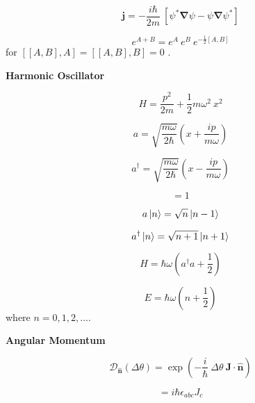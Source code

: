 \documentclass[11pt]{article}
\newcommand{\CurD}{\mathcal{D}}
\newcommand{\vect}[1]{\boldsymbol{\mathbf{#1}}}
\begin{document}
\begin{multicols}{2}
\begin{equation}
\vect{j} = - \frac{i \hbar}{2m} \: [\psi^* \vect{\nabla} \psi - \psi \vect{\nabla} \psi^*]
\end{equation}

\begin{equation}
e^{A+B}=e^A \: e^B \: e^{-\frac{1}{2}[A,B]}
\end{equation}
{\footnotesize for \( [[A,B],A]=[[A,B],B]=0 \) .}

\columnbreak

{\bf Harmonic Oscillator}

\begin{equation}
H = \frac{p^2}{2m} + \frac{1}{2} m \omega^2 \: x^2
\end{equation}

\begin{equation}
a = \sqrt{\frac{m\omega}{2\hbar}} \left( x+\frac{ip}{m\omega} \right)
\end{equation}

\begin{equation}
a^{\dagger} = \sqrt{\frac{m\omega}{2\hbar}} \left( x-\frac{ip}{m\omega} \right)
\end{equation}

\begin{equation}
[\:a, a^{\dagger}] = 1
\end{equation}

\begin{equation}
a \ket{n} = \sqrt{n} \ket{n-1}
\end{equation}

\begin{equation}
a^{\dagger} \ket{n} = \sqrt{n+1} \ket{n+1}
\end{equation}

\begin{equation}
H = \hbar\omega(a^{\dagger}a+\frac{1}{2})
\end{equation}

\begin{equation}
E = \hbar\omega(n+\frac{1}{2})
\end{equation}
where $n=0,1,2,\ldots$.

{\bf Angular Momentum}

\begin{equation}
\CurD_{\vect{\hat{n}}} (\Delta \theta )
  = \exp \left(-\frac{i}{\hbar} \: \Delta \theta \:
               \vect{J} \cdot \vect{\hat{n}} \right )
\end{equation}

\begin{equation}
[J_a,J_b] = i \hbar \epsilon_{abc} J_c
\end{equation}


\end{multicols}
\end{document}
